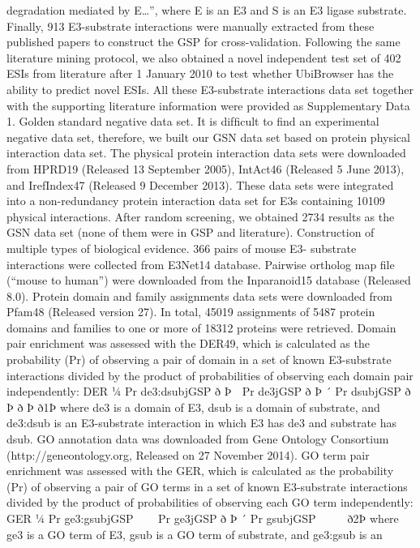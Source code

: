 degradation mediated by E…”, where E is an E3 and S is an E3 ligase substrate.
Finally, 913 E3-substrate interactions were manually extracted from these
published papers to construct the GSP for cross-validation. Following the same
literature mining protocol, we also obtained a novel independent test set of 402
ESIs from literature after 1 January 2010 to test whether UbiBrowser has the ability
to predict novel ESIs. All these E3-substrate interactions data set together with the
supporting literature information were provided as Supplementary Data 1.
Golden standard negative data set. It is difﬁcult to ﬁnd an experimental negative
data set, therefore, we built our GSN data set based on protein physical interaction
data set. The physical protein interaction data sets were downloaded from
HPRD19 (Released 13 September 2005), IntAct46 (Released 5 June 2013), and
IrefIndex47 (Released 9 December 2013). These data sets were integrated into a
non-redundancy protein interaction data set for E3s containing 10109 physical
interactions. After random screening, we obtained 2734 results as the GSN data set
(none of them were in GSP and literature).
Construction of multiple types of biological evidence. 366 pairs of mouse E3-
substrate interactions were collected from E3Net14 database. Pairwise ortholog map
ﬁle (“mouse to human”) were downloaded from the Inparanoid15 database
(Released 8.0).
Protein domain and family assignments data sets were downloaded from
Pfam48 (Released version 27). In total, 45019 assignments of 5487 protein domains
and families to one or more of 18312 proteins were retrieved. Domain pair
enrichment was assessed with the DER49, which is calculated as the probability (Pr)
of observing a pair of domain in a set of known E3-substrate interactions divided
by the product of probabilities of observing each domain pair independently:
DER ¼ Pr de3:dsubjGSP
ð
Þ  Pr de3jGSP
ð
Þ ´ Pr dsubjGSP
ð
Þ
ð
Þ
ð1Þ
where de3 is a domain of E3, dsub is a domain of substrate, and de3:dsub is an
E3-substrate interaction in which E3 has de3 and substrate has dsub.
GO annotation data was downloaded from Gene Ontology Consortium
(http://geneontology.org, Released on 27 November 2014). GO term pair
enrichment was assessed with the GER, which is calculated as the probability (Pr)
of observing a pair of GO terms in a set of known E3-substrate interactions divided
by the product of probabilities of observing each GO term independently:
GER ¼ Pr ge3:gsubjGSP


 Pr ge3jGSP
ð
Þ ´ Pr gsubjGSP




ð2Þ
where ge3 is a GO term of E3, gsub is a GO term of substrate, and ge3:gsub is an
